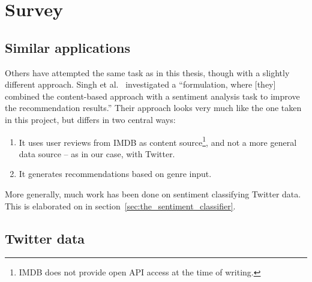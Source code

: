 
\chapter{Survey} %

\label{Chapter2} %




\section{Similar applications} %
\label{sec:similar_applications}

Others have attempted the same task as in this thesis, though with a slightly different approach. Singh et al.~\cite{Singh2011} investigated a ``formulation, where [they] combined the content-based approach with a sentiment analysis task to improve the recommendation results.'' Their approach looks very much like the one taken in this project, but differs in two central ways:

\begin{enumerate}
  \item It uses user reviews from IMDB as content source\footnote{IMDB does not provide open API access at the time of writing.}, and not a more general data source -- as in our case, with Twitter.
  \item It generates recommendations based on genre input.
\end{enumerate}

More generally, much work has been done on sentiment classifying Twitter data. This is elaborated on in section~\ref{sec:the_sentiment_classifier}.



\section{Twitter data} %
\label{sec:twitter_data}

